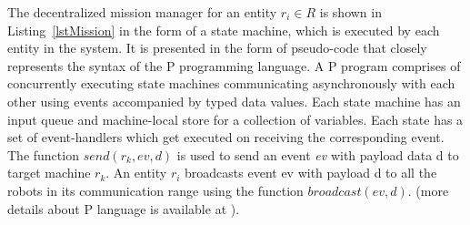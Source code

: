 \documentclass[journal]{IEEEtran}
\theoremstyle{definition}
\newcommand{\del}[1]{\textcolor{red}{\sout{#1}}} %
\begin{document}


The decentralized mission manager for an entity $r_i \in R$ is shown in
Listing~\ref{lstMission} in the form of a state machine, which is executed by
each entity in the system. It is presented in the form of pseudo-code that closely represents the syntax of the P programming language.
A P program comprises of concurrently executing state machines communicating asynchronously with each other
using events accompanied by typed data values. Each state machine
has an input queue and machine-local store for a collection of variables. Each state has a set of event-handlers which
get executed on receiving the corresponding event. The function
$send(r_k, ev, d)$ is used to send an event \textit{ev} with payload data d
to target machine $r_k$. An entity $r_i$ broadcasts event ev with payload d to all the robots in its communication range using the function $broadcast (ev,d)$. (more details about P language is available at \cite{Plang}).

\end{document}
